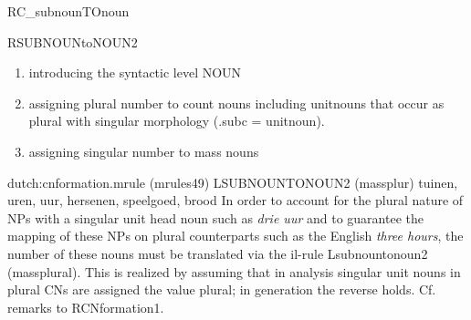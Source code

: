 \begin{mruleclass}{RC\_subnounTOnoun}
\begin{members}
\begin{member}
\end{member}
\begin{member}
 RSUBNOUNtoNOUN2
 \mbox{}\\
\begin{enumerate} 
\item introducing the syntactic level NOUN
\item
assigning plural number to count nouns  including unitnouns
that occur as plural with singular morphology (.subc = unitnoun).
\item assigning singular number to mass nouns 
\end{enumerate}
\file dutch:cnformation.mrule (mrules49)
\semantics LSUBNOUNTONOUN2 (massplur)
\example tuinen, uren, uur,  hersenen, speelgoed, brood
\remarks\mbox{}
In order to account for the plural nature of NPs with a singular unit head noun 
such as {\em drie uur} and to guarantee the mapping of these NPs on plural 
counterparts such as the English {\em three hours},
the number of these nouns must be 
translated via the il-rule Lsubnountonoun2 (massplural). 
This is realized by 
assuming that in analysis singular 
unit nouns in plural CNs are assigned the 
value plural; in generation the reverse holds.
Cf. remarks to RCNformation1.
\end{member}
\end{members}
\end{mruleclass}

